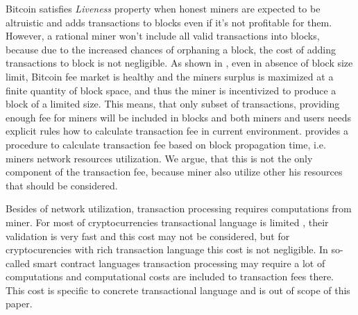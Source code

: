 \documentclass[]{article}   %
\newcommand{\authnote}[2]{\marginpar{\parbox{\marginparwidth}{\tiny %
  \textsf{#1 {\textcolor{blue}{notes: #2}}}}}%
  \textcolor{blue}{\textbf{\dag}}}
\newcommand{\authnote}[2]{
  \textsf{#1 \textcolor{blue}{: #2}}}
\newcommand{\authnote}[2]{}
\newcommand{\knote}[1]{{\authnote{\textcolor{green}{Alex notes}}{#1}}}
\newcommand{\dnote}[1]{{\authnote{\textcolor{blue}{Dima notes}}{#1}}}
\begin{document}
Bitcoin satisfies \textit{Liveness} property when honest miners are expected to be altruistic and adds transactions to blocks even if it's not profitable for them. However, a rational miner won't include all valid transactions into blocks, because due to the increased chances of orphaning a block, the cost of adding transactions to block is not negligible\cite{rizun2015transaction, andresen2013}. As shown in \cite{rizun2015transaction}, even in absence of block size limit, Bitcoin fee market is healthy and the miners surplus is maximized at a finite quantity of block space, and thus the miner is incentivized to produce a block of a limited size. This means, that only subset of transactions, providing enough fee for miners will be included in blocks and both miners and users needs explicit rules how to calculate transaction fee in current environment. \knote{Isn't this claim way too bold and unproven?} \cite{rizun2015transaction} provides a procedure to calculate transaction fee based on block propagation time, i.e. miners network resources utilization. We argue, that this is not the only component of the transaction fee, because miner also utilize other his resources that should be considered.

Besides of network utilization, transaction processing requires computations from miner. For most of cryptocurrencies transactional language is limited \cite{script}, their validation is very fast and this cost may not be considered, but for cryptocurencies with rich transaction language \dnote{more links e.g. for sigma-state} this cost is not negligible. In so-called smart contract languages \cite{seijas2016scripting, tezosScript, solidity} transaction processing may require a lot of computations and computational costs are included to transaction fees there. This cost is specific to concrete transactional language and is out of scope of this paper.
\end{document}
